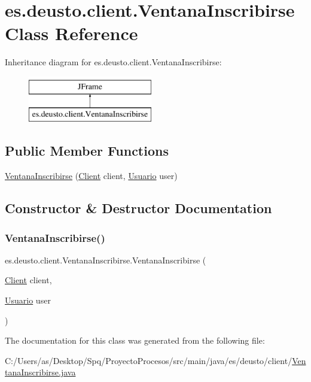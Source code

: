 \hypertarget{classes_1_1deusto_1_1client_1_1_ventana_inscribirse}{}\section{es.\+deusto.\+client.\+Ventana\+Inscribirse Class Reference}
\label{classes_1_1deusto_1_1client_1_1_ventana_inscribirse}
Inheritance diagram for es.\+deusto.\+client.\+Ventana\+Inscribirse\+:\begin{figure}[H]
\begin{center}
\leavevmode
\includegraphics[height=2.000000cm]{classes_1_1deusto_1_1client_1_1_ventana_inscribirse}
\end{center}
\end{figure}
\subsection*{Public Member Functions}
\begin{DoxyCompactItemize}
\item 
\mbox{\hyperlink{classes_1_1deusto_1_1client_1_1_ventana_inscribirse_a6a94a08764b1382b4f5b3545c92e0ad8}{Ventana\+Inscribirse}} (\mbox{\hyperlink{classes_1_1deusto_1_1client_1_1_client}{Client}} client, \mbox{\hyperlink{classes_1_1deusto_1_1server_1_1jdo_1_1_usuario}{Usuario}} user)
\end{DoxyCompactItemize}


\subsection{Constructor \& Destructor Documentation}
\mbox{\label{classes_1_1deusto_1_1client_1_1_ventana_inscribirse_a6a94a08764b1382b4f5b3545c92e0ad8}} 
\subsubsection{\texorpdfstring{VentanaInscribirse()}{VentanaInscribirse()}}
{\footnotesize\ttfamily es.\+deusto.\+client.\+Ventana\+Inscribirse.\+Ventana\+Inscribirse (\begin{DoxyParamCaption}\item[{\mbox{\hyperlink{classes_1_1deusto_1_1client_1_1_client}{Client}}}]{client,  }\item[{\mbox{\hyperlink{classes_1_1deusto_1_1server_1_1jdo_1_1_usuario}{Usuario}}}]{user }\end{DoxyParamCaption})}



The documentation for this class was generated from the following file\+:\begin{DoxyCompactItemize}
\item 
C\+:/\+Users/as/\+Desktop/\+Spq/\+Proyecto\+Procesos/src/main/java/es/deusto/client/\mbox{\hyperlink{_ventana_inscribirse_8java}{Ventana\+Inscribirse.\+java}}\end{DoxyCompactItemize}
